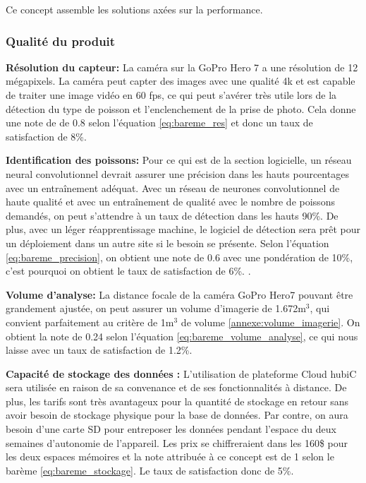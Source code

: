 Ce concept assemble les solutions axées sur la performance.

\subsubsection{Qualité du produit}


\textbf{Résolution du capteur:} La caméra sur la GoPro Hero 7 a une résolution de 12 mégapixels. La caméra peut capter des images avec une qualité 4k et est capable de traiter une image vidéo en 60 fps, ce qui peut s’avérer très utile lors de la détection du type de poisson et l’enclenchement de la prise de photo. Cela donne une note de de 0.8 selon l'équation \ref{eq:bareme_res} et donc un taux de satisfaction de 8\%.
\vspace{5mm}

\textbf{Identification des poissons:}
Pour ce qui est de la section logicielle, un réseau neural convolutionnel devrait assurer une précision dans les hauts pourcentages avec un entraînement adéquat. Avec un réseau de neurones convolutionnel de haute qualité et avec un entraînement de qualité avec le nombre de poissons demandés, on peut s’attendre à un taux de détection dans les hauts 90\%. De plus, avec un léger réapprentissage machine, le logiciel de détection sera prêt pour un déploiement dans un autre site si le besoin se présente. Selon l’équation \ref{eq:bareme_precision}, on obtient une note de 0.6 avec une pondération de 10\%, c’est pourquoi on obtient le taux de satisfaction de 6\%. \cite{neural_yt}.
\vspace{5mm}

\textbf{Volume d'analyse:} La distance focale de la caméra GoPro Hero7 pouvant être grandement ajustée, on peut assurer un volume d’imagerie de 1.672m$^3$, qui convient parfaitement au critère de 1m$^3$ de volume \ref{annexe:volume_imagerie}.  On obtient la note de 0.24 selon l'équation \ref{eq:bareme_volume_analyse}, ce qui nous laisse avec un taux de satisfaction de 1.2\%.
\vspace{5mm}

\textbf{Capacité de stockage des données :}
L’utilisation de plateforme Cloud hubiC sera utilisée en raison de sa convenance et de ses fonctionnalités à distance. De plus, les tarifs sont très avantageux pour la quantité de stockage en retour sans avoir besoin de stockage physique pour la base de données. Par contre, on aura besoin d’une carte SD pour entreposer les données pendant l’espace du deux semaines d’autonomie de l’appareil. Les prix se chiffreraient dans les 160\$ pour les deux espaces mémoires et la note attribuée à ce concept est de 1 selon le barème \ref{eq:bareme_stockage}. Le taux de satisfaction donc de 5\%.
\vspace{5mm}


